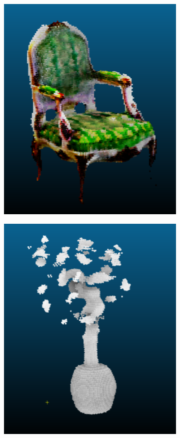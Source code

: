 \documentclass{article}
\begin{document}
\begin{figure}[!h]
\begin{subfigure}{.24\textwidth}
  \includegraphics[width=\linewidth]{figs/pc/chairc.png}  
\end{subfigure}
\begin{subfigure}{.24\textwidth}
  \centering
  \includegraphics[width=\linewidth]{figs/pc/ficus.png}  

\end{subfigure}
\end{figure}
\end{document}

